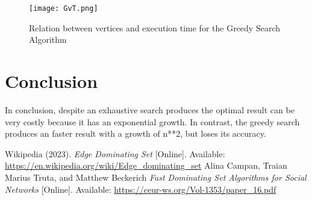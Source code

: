 \documentclass[...]{revdetua}
\begin{document}
\begin{figure}[H]
\centering
\texttt{[image: GvT.png]}
\label{fig:GvA}
\caption{Relation between vertices and execution time for the Greedy Search Algorithm}
\end{figure}


\section{Conclusion}
In conclusion, despite an exhaustive search produces the optimal result can be very costly because it has an exponential growth. In contrast, the greedy search produces an faster result with a growth of n**2, but loses its accuracy.



 Wikipedia (2023). \textit{Edge Dominating Set} [Online]. Available: \url{https://en.wikipedia.org/wiki/Edge_dominating_set}
 Alina Campan, Traian Marius Truta, and Matthew Beckerich \textit{Fast Dominating Set Algorithms for Social Networks} [Online]. Available: \url{https://ceur-ws.org/Vol-1353/paper_16.pdf}
\end{document}
